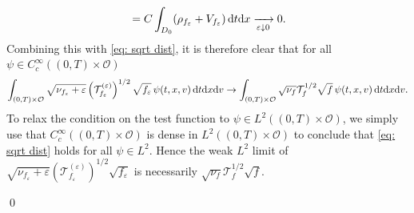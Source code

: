 \documentclass[10pt, reqno]{amsart}
\theoremstyle{plain}
\theoremstyle{definition}
\theoremstyle{remark}
\renewenvironment{proof}[1][\proofname]{\noindent{\scshape #1.\quad}}{\qed}
\numberwithin{equation}{section}
\newcommand{\calO}{\mathcal O}
\newcommand{\calT}{\mathcal T}
\newcommand{\ve}{\varepsilon}
\newcommand{\dx}{\textnormal{d}x}
\newcommand{\dv}{\textnormal{d}v}
\newcommand{\dt}{\textnormal{d}t}
\newcommand{\lt}{\left}
\newcommand{\rt}{\right}
\begin{document}
\begin{proof}
\begin{equation}
\begin{split}
        &\quad= C \int_{D_0} (\rho_{f_\ve} + V_{f_\ve}) \,\dt\dx \xrightarrow[\ve\downarrow 0]{} 0.
    \end{split}
    \end{equation}
    Combining this with \eqref{eq: sqrt dist}, it is therefore clear that for all $\psi\in C_c^\infty((0,T)\times\calO)$
    \begin{align*}
        \int_{(0,T)\times \calO} \sqrt{\nu_{f_\ve} + \ve} \lt(\calT_{f_\ve}^{(\ve)}\rt)^{1/2}\sqrt{f_\ve} \, \psi(t,x,v) \,\dt\dx\dv \to \int_{(0,T)\times \calO} \sqrt{\nu_f} \calT_f^{1/2} \sqrt{f} \,\psi(t,x,v) \,\dt\dx\dv.
    \end{align*}
    To relax the condition on the test function to $\psi\in L^2((0,T)\times \calO)$, we simply use that $C_c^\infty((0,T)\times \calO)$ is dense in $L^2((0,T)\times \calO)$ to conclude that \eqref{eq: sqrt dist} holds for all $\psi\in L^2$. Hence the weak $L^2$ limit of $\sqrt{\nu_{f_\ve} + \ve}\lt(\calT_{f_\ve}^{(\ve)}\rt)^{1/2}\sqrt{f_\ve}$ is necessarily $\sqrt{\nu_f}\calT_f^{1/2} \sqrt{f}$.


\end{proof}
\end{document}

